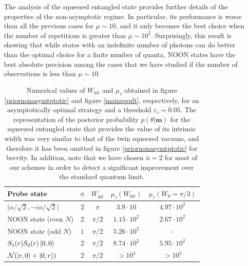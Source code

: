 The analysis of the squeezed entangled state provides further details of the properties of the non-asymptotic regime. In particular, its performance is worse than all the previous cases for $\mu \sim 10$, and it only becomes the best choice when the number of repetitions is greater than $\mu \sim 10^2$. Surprisingly, this result is showing that while states with an indefinite number of photons can do better than the optimal choice for a finite number of quanta, NOON states have the best absolute precision among the cases that we have studied if the number of observations is less than $\mu \sim 10$.

\begin{table} [t]
\centering
{\renewcommand{\arraystretch}{1.05}
\begin{tabular}{|l|c|c|c|c|}
\hline
Probe state & $\bar{n}$ & $W_{\mathrm{int}}$ & $\mu_{\tau} (W_{\mathrm{int}})$ & $\mu_{\tau} (W_0=\pi/3)$\\
\hline
\hline
$|\alpha/\sqrt{2},-i\alpha/\sqrt{2}\rangle$ & $2$ & $\pi$ & $3.9\cdot 10$ & $4.97\cdot 10^2$\\
NOON state (even $N$) & $2$ & $\pi/2$ & $1.15\cdot 10^2$ &$2.67\cdot 10^2$\\
NOON state (odd $N$)& $1$ & $\pi/2$ & $5.26\cdot 10^2$ & - \\
$S_1(r)S_2(r)\ket{0,0}$ & $2$ & $\pi/2$ & $8.74\cdot 10^2$ & $5.95\cdot 10^2$\\
$\mathcal{N}(\ket{r,0}+\ket{0,r})$ & $2$ & $\pi/2$ & $>10^3$ &$ >10^3$\\
\hline
\end{tabular}}
\caption[Conditions to reach the asymptotic regime]{Numerical values of $W_{\mathrm{int}}$ and $\mu_{\tau}$ obtained in figure \ref{priornonasymtptotic} and figure \ref{mainresult}, respectively, for an asymptotically optimal strategy and a threshold $\varepsilon_\tau = 0.05$. The representation of the posterior probability $p(\theta|\boldsymbol{m})$ for the squeezed entangled state that provides the value of its intrinsic width was very similar to that of the twin squeezed vacuum, and therefore it has been omitted in figure \ref{priornonasymtptotic} for brevity. In addition, note that we have chosen $\bar{n} = 2$ for most of our schemes in order to detect a significant improvement over the standard quantum limit.}
\label{table_summary}
\end{table}

